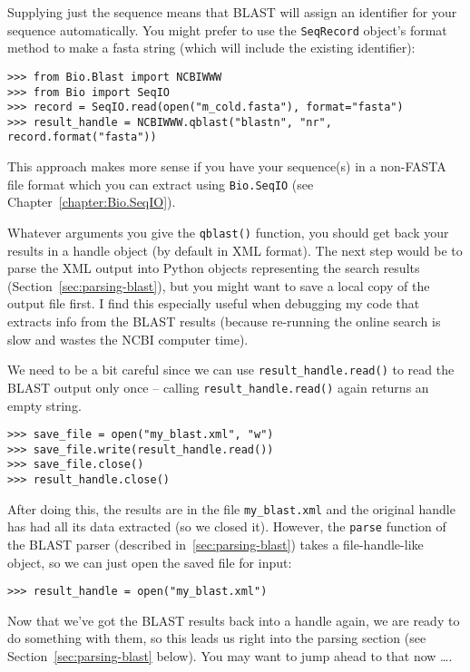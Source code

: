 \documentclass{report}
\begin{document}
Supplying just the sequence means that BLAST will assign an identifier
for your sequence automatically.  You might prefer to use the
\verb|SeqRecord| object's format method to make a fasta string
(which will include the existing identifier):

\begin{verbatim}
>>> from Bio.Blast import NCBIWWW
>>> from Bio import SeqIO
>>> record = SeqIO.read(open("m_cold.fasta"), format="fasta")
>>> result_handle = NCBIWWW.qblast("blastn", "nr", record.format("fasta"))
\end{verbatim}

This approach makes more sense if you have your sequence(s) in a
non-FASTA file format which you can extract using \verb|Bio.SeqIO|
(see Chapter~\ref{chapter:Bio.SeqIO}).

Whatever arguments you give the \verb|qblast()| function, you should
get back your results in a handle object (by default in XML format).
The next step would be to parse the XML output into Python objects
representing the search results (Section~\ref{sec:parsing-blast}),
but you might want to save a local copy of the output file first.
I find this especially useful when debugging my code that extracts
info from the BLAST results (because re-running the online search
is slow and wastes the NCBI computer time).

\label{sec:saving-blast-output}

We need to be a bit careful since we can use \verb|result_handle.read()| to
read the BLAST output only once -- calling \verb|result_handle.read()| again
returns an empty string.

\begin{verbatim}
>>> save_file = open("my_blast.xml", "w")
>>> save_file.write(result_handle.read())
>>> save_file.close()
>>> result_handle.close()
\end{verbatim}

After doing this, the results are in the file \verb|my_blast.xml| and the
original handle has had all its data extracted (so we closed it). However,
the \verb|parse| function of the BLAST parser (described
in~\ref{sec:parsing-blast}) takes a file-handle-like object, so
we can just open the saved file for input:

\begin{verbatim}
>>> result_handle = open("my_blast.xml")
\end{verbatim}

Now that we've got the BLAST results back into a handle again, we are ready
to do something with them, so this leads us right into the parsing section
(see Section~\ref{sec:parsing-blast} below). You may want to jump ahead to
that now \ldots.
\end{document}
